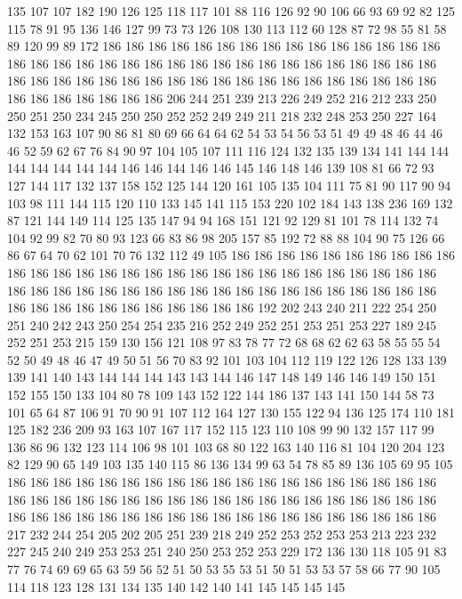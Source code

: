 135 107 107 182 190 126 125 118 117 101 88 116 126 92 90 106 66 93 69 92
82 125 115 78 91 95 136 146 127 99 73 73 126 108 130 113 112 60 128 87
72 98 55 81 58 89 120 99 89 172 186 186 186 186 186 186 186 186 186 186
186 186 186 186 186 186 186 186 186 186 186 186 186 186 186 186 186 186 186 186
186 186 186 186 186 186 186 186 186 186 186 186 186 186 186 186 186 186 186 186
186 186 186 186 186 186 186 186 186 186 206 244 251 239 213 226 249 252 216 212
233 250 250 251 250 234 245 250 250 252 252 249 249 211 218 232 248 253 250 227
164 132 153 163 107 90 86 81 80 69 66 64 64 62 54 53 54 56 53 51
49 49 48 46 44 46 46 52 59 62 67 76 84 90 97 104 105 107 111 116
124 132 135 139 134 141 144 144 144 144 144 144 144 146 146 144 146 146 145 146
148 146 139 108 81 66 72 93 127 144 117 132 137 158 152 125 144 120 161 105
135 104 111 75 81 90 117 90 94 103 98 111 144 115 120 110 133 145 141 115
153 220 102 184 143 138 236 169 132 87 121 144 149 114 125 135 147 94 94 168
151 121 92 129 81 101 78 114 132 74 104 92 99 82 70 80 93 123 66 83
86 98 205 157 85 192 72 88 88 104 90 75 126 66 86 67 64 70 62 101
70 76 132 112 49 105 186 186 186 186 186 186 186 186 186 186 186 186 186 186
186 186 186 186 186 186 186 186 186 186 186 186 186 186 186 186 186 186 186 186
186 186 186 186 186 186 186 186 186 186 186 186 186 186 186 186 186 186 186 186
186 186 186 186 186 192 202 243 240 211 222 254 250 251 240 242 243 250 254 254
235 216 252 249 252 251 253 251 253 227 189 245 252 251 253 215 159 130 156 121
108 97 83 78 77 72 68 68 62 62 63 58 55 55 54 52 50 49 48 46
47 49 50 51 56 70 83 92 101 103 104 112 119 122 126 128 133 139 139 141
140 143 144 144 144 143 143 144 146 147 148 149 146 146 149 150 151 152 155 150
133 104 80 78 109 143 152 122 144 186 137 143 141 150 144 58 73 101 65 64
87 106 91 70 90 91 107 112 164 127 130 155 122 94 136 125 174 110 181 125
182 236 209 93 163 107 167 117 152 115 123 110 108 99 90 132 157 117 99 136
86 96 132 123 114 106 98 101 103 68 80 122 163 140 116 81 104 120 204 123
82 129 90 65 149 103 135 140 115 86 136 134 99 63 54 78 85 89 136 105
69 95 105 186 186 186 186 186 186 186 186 186 186 186 186 186 186 186 186 186
186 186 186 186 186 186 186 186 186 186 186 186 186 186 186 186 186 186 186 186
186 186 186 186 186 186 186 186 186 186 186 186 186 186 186 186 186 186 186 186
217 232 244 254 205 202 205 251 239 218 249 252 253 252 253 253 213 223 232 227
245 240 249 253 253 251 240 250 253 252 253 229 172 136 130 118 105 91 83 77
76 74 69 69 65 63 59 56 52 51 50 53 55 53 51 50 51 53 53 57
58 66 77 90 105 114 118 123 128 131 134 135 140 142 140 141 145 145 145 145
